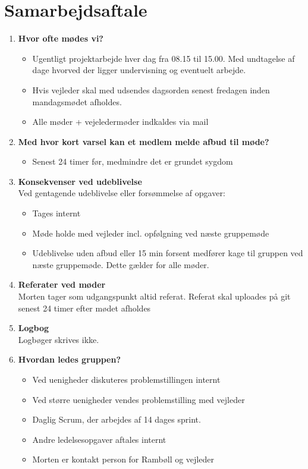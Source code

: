 \chapter{Samarbejdsaftale}
\begin{enumerate}
	\item \textbf{Hvor ofte mødes vi?}
	\begin{itemize}[-]
		\itemsep 0.3em
		\item Ugentligt projektarbejde hver dag fra 08.15 til 15.00. Med undtagelse af dage hvorved der ligger undervisning og eventuelt arbejde.
		\item Hvis vejleder skal med udsendes dagsorden senest fredagen inden mandagsmødet afholdes.
		\item Alle møder + vejeledermøder indkaldes via mail
		\vspace{1cm}				
	\end{itemize}
	\item \textbf{Med hvor kort varsel kan et medlem melde afbud til møde?}
	\begin{itemize}[-]
		\itemsep 0.3em
		\item Senest 24 timer før, medmindre det er grundet sygdom
		\vspace{1cm}
	\end{itemize}
	
	\item \textbf{Konsekvenser ved udeblivelse}\\
	Ved gentagende udeblivelse eller forsømmelse af opgaver:
	\begin{itemize}[-]
		\itemsep 0.3em
		\item Tages internt
		\item Møde holde med vejleder incl. opfølgning ved næste gruppemøde
		\item Udeblivelse uden afbud eller 15 min forsent medfører kage til gruppen ved næste gruppemøde. Dette gælder for alle møder.
		\vspace{1cm}
	\end{itemize}
	\item \textbf{Referater ved møder} \\
	Morten tager som udgangspunkt altid referat.
	Referat skal uploades på git senest 24 timer efter mødet afholdes
	\vspace{1cm}
	
	\item \textbf{Logbog}\\
	Logbøger skrives ikke.
	\vspace{1cm}
	\item \textbf{Hvordan ledes gruppen?}
	\begin{itemize}[-]
		\itemsep 0.3em
		\item Ved uenigheder diskuteres problemstillingen internt
		\item Ved større uenigheder vendes problemstilling med vejleder
		\item Daglig Scrum, der arbejdes af 14 dages sprint.
		\item Andre ledelsesopgaver aftales internt
		\item Morten er kontakt person for Rambøll og vejleder
		\vspace{1cm}
	\end{itemize}
	

\end{enumerate}
